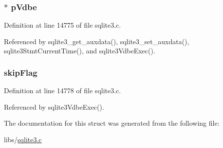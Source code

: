 \hypertarget{structsqlite3__context_ac73302f0c912cb7b3c9b1cea509e6077}{}
\subsubsection[{p\+Vdbe}]{$\ast$ p\+Vdbe}\label{structsqlite3__context_ac73302f0c912cb7b3c9b1cea509e6077}


Definition at line 14775 of file sqlite3.\+c.



Referenced by sqlite3\+\_\+get\+\_\+auxdata(), sqlite3\+\_\+set\+\_\+auxdata(), sqlite3\+Stmt\+Current\+Time(), and sqlite3\+Vdbe\+Exec().

\hypertarget{structsqlite3__context_ad40ba195f4593759f0397fa436e47c89}{}
\subsubsection[{skip\+Flag}]{ skip\+Flag}\label{structsqlite3__context_ad40ba195f4593759f0397fa436e47c89}


Definition at line 14778 of file sqlite3.\+c.



Referenced by sqlite3\+Vdbe\+Exec().



The documentation for this struct was generated from the following file\+:\begin{DoxyCompactItemize}
\item 
libs/\hyperlink{sqlite3_8c}{sqlite3.\+c}\end{DoxyCompactItemize}
